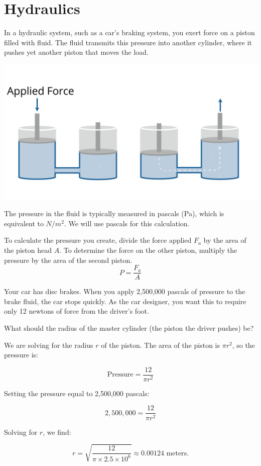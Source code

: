 \section{Hydraulics}

In a hydraulic system, such as a car's braking system, you exert force on a piston filled with fluid. The fluid transmits this pressure into another cylinder, where it pushes yet another piston that moves the load.

\includegraphics[width=\textwidth]{hydraulicsNew.png}

The pressure in the fluid is typically measured in pascals (Pa), which is equivalent to \(N / m^2\). We will use pascals for this calculation.

To calculate the pressure you create, divide the force applied $F_{a}$ by the area of the piston head $A$. To determine the force on the other piston, multiply the pressure by the area of the second piston.
\[
P = \frac{F_{a}}{A}
\]




\begin{Exercise}[title={Hydraulics}, label=hydraulics]
Your car has disc brakes. When you apply 2,500,000 pascals of pressure to the brake fluid, the car stops quickly. As the car designer, you want this to require only 12 newtons of force from the driver's foot.

What should the radius of the master cylinder (the piston the driver pushes) be?
\end{Exercise}
\begin{Answer}[ref=hydraulics]
We are solving for the radius \( r \) of the piston. The area of the piston is \( \pi r^2 \), so the pressure is:

\[
\text{Pressure} = \frac{12}{\pi r^2}
\]

Setting the pressure equal to 2,500,000 pascals:

\[
2,500,000 = \frac{12}{\pi r^2}
\]

Solving for \( r \), we find:

\[
r = \sqrt{\frac{12}{\pi \times 2.5 \times 10^6}} \approx 0.00124 \text{ meters}.
\]
\end{Answer}
